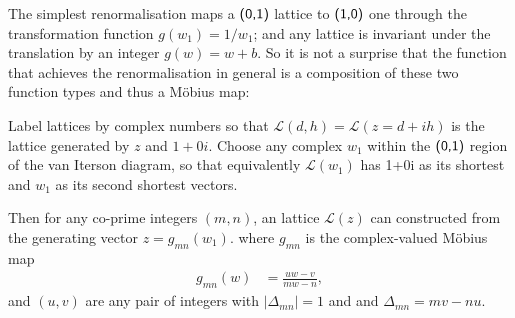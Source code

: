 The simplest renormalisation maps a $\textsf{(0,1)}$ lattice to $\textsf{(1,0)}$ one through the transformation  function $g(w_1)=1/w_1$; and any lattice is invariant under the translation by an integer $g(w)=w+b$. So it is not a surprise that 
 the function that achieves the renormalisation in general is a composition of these two function types and thus a M\"obius map:
\begin{theorem}
		\label{thm:renormalization}
		Label lattices by complex numbers so that $\mathcal{L}(d,h)=\mathcal{L}(z=d+ih)$ is the lattice generated by $z$ and $1+0i$. 
		Choose any complex $w_1$ within the $\textsf{(0,1)}$  region of the van Iterson diagram, so that equivalently $\mathcal{L}(w_1)$ has  1+0i as its shortest and $w_1$ as its second shortest vectors.
		
		Then for any co-prime integers $(m,n)$, an   lattice  $\mathcal{L}(z)$ can constructed from the generating vector $z=  g_{mn}(w_1)$. 		 
		 where 	$g_{mn}$ is the complex-valued
		 M\"obius map
		 \begin{align}
		 	\label{eq:gDefinition}
		 	g_{mn}(w)& = \frac{ u   w- v}{ m  w   -n},
		 \end{align}
		 and $(u,v)$ are any pair of integers with   $|\Delta_{mn}|=1$ and and  $\Delta_{mn}=mv-nu$. 
\end{theorem}


